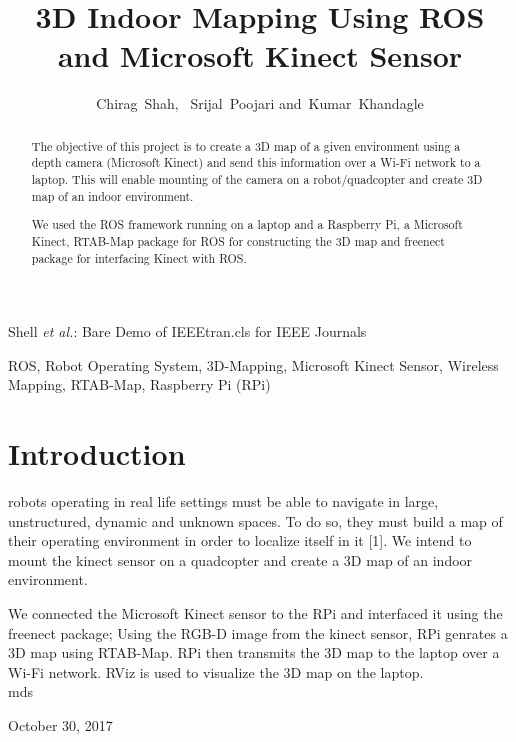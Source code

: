 \documentclass[journal]{IEEEtran}
\begin{document}
\title{3D Indoor Mapping Using ROS and Microsoft Kinect Sensor}
\author{Chirag~Shah,
        ~Srijal~Poojari
    	and~Kumar~Khandagle}%
%
{Shell \MakeLowercase{\textit{et al.}}: Bare Demo of IEEEtran.cls for IEEE Journals}

\maketitle
\begin{abstract}
The objective of this project is to create a 3D map of a given environment using a depth camera (Microsoft Kinect) and send this information over a Wi-Fi network to a laptop. This will enable mounting of the camera on a robot/quadcopter and create 3D  map of an indoor environment.

We used the ROS framework running on a laptop and a Raspberry Pi, a Microsoft Kinect, RTAB-Map package for ROS for constructing the 3D map and freenect package for interfacing Kinect with ROS.
\end{abstract}

\begin{IEEEkeywords}
ROS, Robot Operating System, 3D-Mapping, Microsoft Kinect Sensor, Wireless Mapping, RTAB-Map, Raspberry Pi (RPi)
\end{IEEEkeywords}

\section{Introduction}
 robots operating in real life settings must be able to navigate in large, unstructured, dynamic and unknown spaces. To do so, they must build a map of their operating environment in order to localize itself in it [1]. We intend to mount the kinect sensor on a quadcopter and create a 3D map of an indoor environment.

We connected the Microsoft Kinect sensor to the RPi and interfaced it using the freenect package; Using the RGB-D image from the kinect sensor, RPi genrates a 3D map using RTAB-Map. RPi then transmits the 3D map to the laptop over a Wi-Fi network. RViz is used to visualize the 3D map on the laptop.
\\

\hfill mds
 
\hfill October 30, 2017
\end{document}
